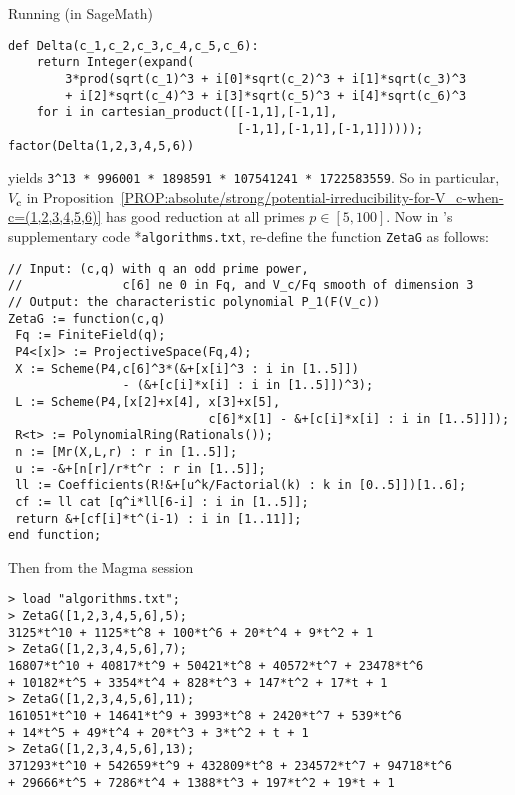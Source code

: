\documentclass[12pt]{report}
\begin{document}
Running (in SageMath)
\begin{verbatim}
def Delta(c_1,c_2,c_3,c_4,c_5,c_6):
    return Integer(expand(
        3*prod(sqrt(c_1)^3 + i[0]*sqrt(c_2)^3 + i[1]*sqrt(c_3)^3
        + i[2]*sqrt(c_4)^3 + i[3]*sqrt(c_5)^3 + i[4]*sqrt(c_6)^3
    for i in cartesian_product([[-1,1],[-1,1],
                                [-1,1],[-1,1],[-1,1]]))));
factor(Delta(1,2,3,4,5,6))
\end{verbatim}
yields \verb!3^13 * 996001 * 1898591 * 107541241 * 1722583559!.
So in particular,
$V_{\bm{c}}$ in Proposition~\ref{PROP:absolute/strong/potential-irreducibility-for-V_c-when-c=(1,2,3,4,5,6)}
has good reduction at all primes $p\in[5,100]$.
Now in \cite{debarre2021lines}'s supplementary code \cite{github-alaface-CubLin-2016}*{{\tt algorithms.txt}},
re-define the function {\tt ZetaG} as follows:
\begin{verbatim}
// Input: (c,q) with q an odd prime power,
//              c[6] ne 0 in Fq, and V_c/Fq smooth of dimension 3
// Output: the characteristic polynomial P_1(F(V_c))
ZetaG := function(c,q)
 Fq := FiniteField(q);
 P4<[x]> := ProjectiveSpace(Fq,4);
 X := Scheme(P4,c[6]^3*(&+[x[i]^3 : i in [1..5]])
                - (&+[c[i]*x[i] : i in [1..5]])^3);
 L := Scheme(P4,[x[2]+x[4], x[3]+x[5],
                            c[6]*x[1] - &+[c[i]*x[i] : i in [1..5]]]);
 R<t> := PolynomialRing(Rationals());
 n := [Mr(X,L,r) : r in [1..5]];
 u := -&+[n[r]/r*t^r : r in [1..5]];
 ll := Coefficients(R!&+[u^k/Factorial(k) : k in [0..5]])[1..6];
 cf := ll cat [q^i*ll[6-i] : i in [1..5]];
 return &+[cf[i]*t^(i-1) : i in [1..11]];
end function;
\end{verbatim}
Then from the Magma session
\begin{verbatim}
> load "algorithms.txt";
> ZetaG([1,2,3,4,5,6],5);
3125*t^10 + 1125*t^8 + 100*t^6 + 20*t^4 + 9*t^2 + 1
> ZetaG([1,2,3,4,5,6],7);
16807*t^10 + 40817*t^9 + 50421*t^8 + 40572*t^7 + 23478*t^6
+ 10182*t^5 + 3354*t^4 + 828*t^3 + 147*t^2 + 17*t + 1
> ZetaG([1,2,3,4,5,6],11);
161051*t^10 + 14641*t^9 + 3993*t^8 + 2420*t^7 + 539*t^6
+ 14*t^5 + 49*t^4 + 20*t^3 + 3*t^2 + t + 1
> ZetaG([1,2,3,4,5,6],13);
371293*t^10 + 542659*t^9 + 432809*t^8 + 234572*t^7 + 94718*t^6
+ 29666*t^5 + 7286*t^4 + 1388*t^3 + 197*t^2 + 19*t + 1
\end{verbatim}
\end{document}
